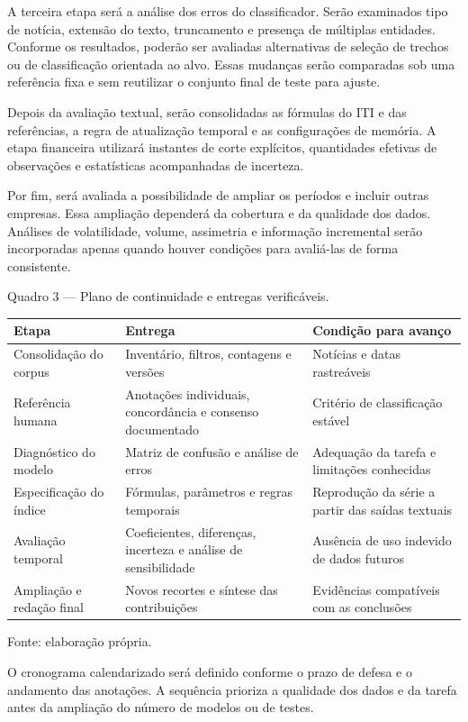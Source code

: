 A terceira etapa será a análise dos erros do classificador. Serão examinados tipo de notícia, extensão do texto, truncamento e presença de múltiplas entidades. Conforme os resultados, poderão ser avaliadas alternativas de seleção de trechos ou de classificação orientada ao alvo. Essas mudanças serão comparadas sob uma referência fixa e sem reutilizar o conjunto final de teste para ajuste.

Depois da avaliação textual, serão consolidadas as fórmulas do ITI e das referências, a regra de atualização temporal e as configurações de memória. A etapa financeira utilizará instantes de corte explícitos, quantidades efetivas de observações e estatísticas acompanhadas de incerteza.

Por fim, será avaliada a possibilidade de ampliar os períodos e incluir outras empresas. Essa ampliação dependerá da cobertura e da qualidade dos dados. Análises de volatilidade, volume, assimetria e informação incremental serão incorporadas apenas quando houver condições para avaliá-las de forma consistente.

Quadro 3 — Plano de continuidade e entregas verificáveis.

\begin{table}[htbp]
\centering
\small
\begin{tabular}{|p{}|p{}|p{}|}
\hline
Etapa & Entrega & Condição para avanço \\
\hline
Consolidação do corpus & Inventário, filtros, contagens e versões & Notícias e datas rastreáveis \\
Referência humana & Anotações individuais, concordância e consenso documentado & Critério de classificação estável \\
Diagnóstico do modelo & Matriz de confusão e análise de erros & Adequação da tarefa e limitações conhecidas \\
Especificação do índice & Fórmulas, parâmetros e regras temporais & Reprodução da série a partir das saídas textuais \\
Avaliação temporal & Coeficientes, diferenças, incerteza e análise de sensibilidade & Ausência de uso indevido de dados futuros \\
Ampliação e redação final & Novos recortes e síntese das contribuições & Evidências compatíveis com as conclusões \\
\hline
\end{tabular}
\end{table}

{\footnotesize Fonte: elaboração própria.}

O cronograma calendarizado será definido conforme o prazo de defesa e o andamento das anotações. A sequência prioriza a qualidade dos dados e da tarefa antes da ampliação do número de modelos ou de testes.

